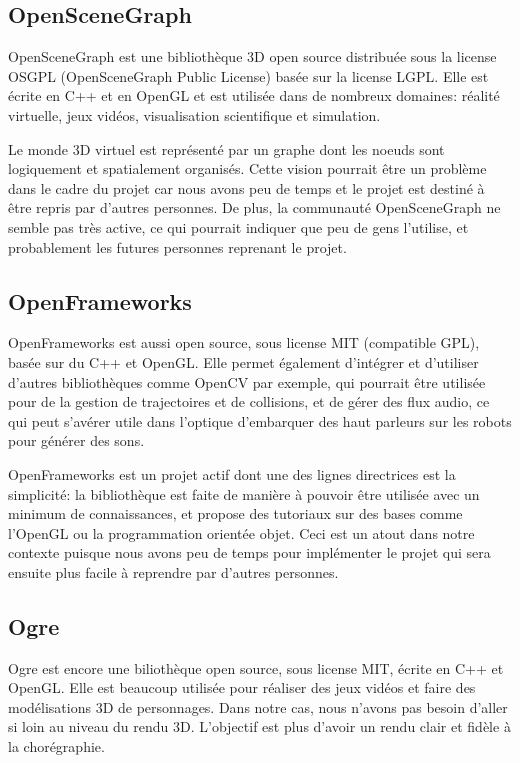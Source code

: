 \subsection{OpenSceneGraph}

OpenSceneGraph est une bibliothèque 3D open source distribuée sous la license OSGPL (OpenSceneGraph Public License) basée sur la license LGPL. Elle est écrite en C++ et en OpenGL et est utilisée dans de nombreux domaines: réalité virtuelle, jeux vidéos, visualisation scientifique et simulation. 

Le monde 3D virtuel est représenté par un graphe dont les noeuds sont logiquement et spatialement organisés. Cette vision pourrait être un problème dans le cadre du projet car nous avons peu de temps et le projet est destiné à être repris par d'autres personnes. De plus, la communauté OpenSceneGraph ne semble pas très active, ce qui pourrait indiquer que peu de gens l'utilise, et probablement les futures personnes reprenant le projet. 


\subsection{OpenFrameworks}

OpenFrameworks est aussi open source, sous license MIT (compatible GPL), basée sur du C++ et OpenGL. Elle permet également d'intégrer et d'utiliser d'autres bibliothèques comme OpenCV par exemple, qui pourrait être utilisée pour de la gestion de trajectoires et de collisions, et de gérer des flux audio, ce qui peut s'avérer utile dans l'optique d'embarquer des haut parleurs sur les robots pour générer des sons. 

OpenFrameworks est un projet actif dont une des lignes directrices est la simplicité: la bibliothèque est faite de manière à pouvoir être utilisée avec un minimum de connaissances, et propose des tutoriaux sur des bases comme l'OpenGL ou la programmation orientée objet. Ceci est un atout dans notre contexte puisque nous avons peu de temps pour implémenter le projet qui sera ensuite plus facile à reprendre par d'autres personnes.

\subsection{Ogre}

Ogre est encore une biliothèque open source, sous license MIT, écrite en C++ et OpenGL. Elle est beaucoup utilisée pour réaliser des jeux vidéos et faire des modélisations 3D de personnages. Dans notre cas, nous n'avons pas besoin d'aller si loin au niveau du rendu 3D. L'objectif est plus d'avoir un rendu clair et fidèle à la chorégraphie.  

